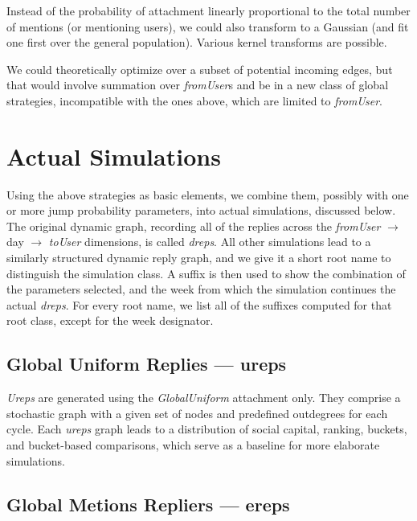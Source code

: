 \documentclass[10pt,oneside]{memoir}
\begin{document}
\begin{Spacing}{2}
Instead of the probability of attachment linearly proportional to the total number of mentions (or mentioning users), we could also transform to a Gaussian (and fit one first over the general population).  Various kernel transforms are possible.


We could theoretically optimize over a subset of potential incoming edges, but that would involve summation over \emph{fromUser}s and be in a new class of global strategies, incompatible with the ones above, which are limited to {\itshape fromUser}.


\pagebreak \section{Actual Simulations}
\label{actualsimulations}

Using the above strategies as basic elements, we combine them, possibly with one or more jump probability parameters, into actual simulations, discussed below.  The original dynamic graph, recording all of the replies across the {\itshape fromUser} $\rightarrow$ day $\rightarrow$ {\itshape toUser} dimensions, is called {\itshape dreps}.  All other simulations lead to a similarly structured dynamic reply graph, and we give it a short root name to distinguish the simulation class.  A suffix is then used to show the combination of the parameters selected, and the week from which the simulation continues the actual {\itshape dreps}.  For every root name, we list all of the suffixes computed for that root class, except for the week designator.


\subsection{Global Uniform Replies --- ureps}
\label{globaluniformrepliesureps}

{\itshape Ureps} are generated using the {\itshape GlobalUniform} attachment only.  They comprise a stochastic graph with a given set of nodes and predefined outdegrees for each cycle.  Each {\itshape ureps} graph leads to a distribution of social capital, ranking, buckets, and bucket-based comparisons, which serve as a baseline for more elaborate simulations.


\subsection{Global Metions Repliers --- ereps}
\label{globalmetionsrepliersereps}


\end{Spacing}
\end{document}
